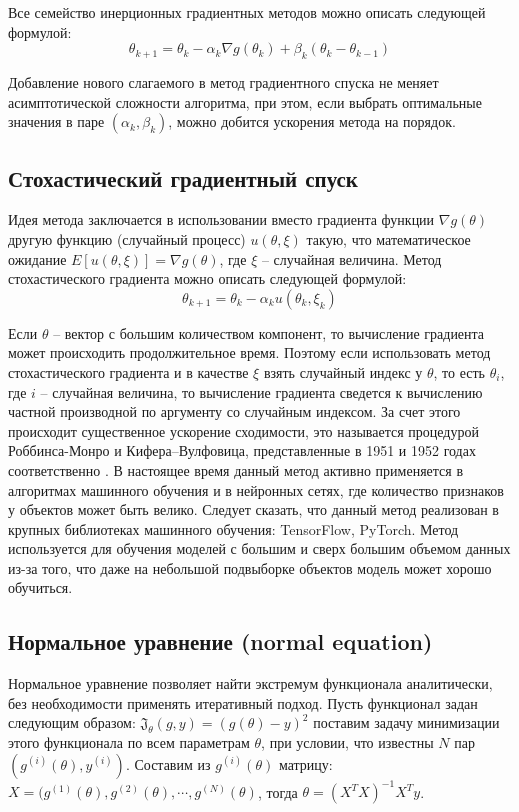 Все семейство инерционных градиентных методов можно описать следующей формулой:
$$ \theta_{k+1} = \theta_k - \alpha_k \nabla g(\theta_k) + \beta_k (\theta_k - \theta_{k-1}) $$

Добавление нового слагаемого в метод градиентного спуска не меняет асимптотической сложности алгоритма, при этом, если выбрать оптимальные значения в паре $(\alpha_k, \beta_k)$, можно добится ускорения метода на порядок.


\subsection{Стохастический градиентный спуск}

Идея метода заключается в использовании вместо градиента функции $\nabla g(\theta)$ другую функцию (случайный процесс) $u(\theta,\xi)$ такую, что математическое ожидание $E[u(\theta,\xi)] = \nabla g(\theta)$, где $\xi$ -- случайная величина.
Метод стохастического градиента можно описать следующей формулой:
$$ \theta_{k+1} = \theta_k - \alpha_k u(\theta_k,\xi_k) $$

Если $\theta$ -- вектор с большим количеством компонент, то вычисление градиента может происходить продолжительное время. Поэтому если использовать метод стохастического градиента и в качестве $\xi$ взять случайный индекс у $\theta$, то есть $\theta_i$, где $i$ -- случайная величина, то вычисление градиента сведется к вычислению частной производной по аргументу со случайным индексом. За счет этого происходит существенное ускорение сходимости, это называется процедурой Роббинса-Монро и Кифера–Вулфовица, представленные в 1951 и 1952 годах соответственно \cite{wiki:stochastic_grad}. В настоящее время данный метод активно применяется в алгоритмах машинного обучения и в нейронных сетях, где количество признаков у объектов может быть велико. Следует сказать, что данный метод реализован в крупных библиотеках машинного обучения: TensorFlow, PyTorch. Метод используется для обучения моделей с большим и сверх большим объемом данных из-за того, что даже на небольшой подвыборке объектов модель может хорошо обучиться.


\subsection{Нормальное уравнение (normal equation)}

Нормальное уравнение позволяет найти экстремум функционала аналитически, без необходимости применять итеративный подход. Пусть функционал задан следующим образом: $\mathfrak{J}_{\theta}(g, y) = (g(\theta) - y)^2$ поставим задачу минимизации этого функционала по всем параметрам $\theta$, при условии, что известны $N$ пар $(g^{(i)}(\theta), y^{(i)})$. Составим из $g^{(i)}(\theta)$ матрицу: $X = (g^{(1)}(\theta), g^{(2)}(\theta), \cdots, g^{(N)}(\theta)$, тогда $\theta = (X^{T} X)^{-1} X^{T} y$.


